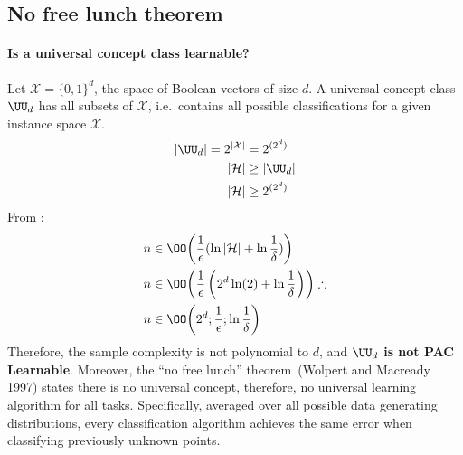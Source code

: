 \documentclass[
  letterpaper,
  12pt,
  british]{tufte-book}
\let\oldparagraph\paragraph
\renewcommand{\paragraph}[1]{\oldparagraph{#1}\mbox{}}
\theoremstyle{plain}
\theoremstyle{definition}
\theoremstyle{plain}
\theoremstyle{remark}
\begin{document}
\hypertarget{no-free-lunch-theorem}{%
\subsection{No free lunch theorem}\label{no-free-lunch-theorem}}

\hypertarget{is-a-universal-concept-class-learnable}{%
\paragraph{Is a universal concept class
learnable?}\label{is-a-universal-concept-class-learnable}}

Let \(\mathcal{X}=\{0,1\}^{d}\), the space of Boolean vectors of size
\(d\). A universal concept class \(\UU_d\) has all subsets of
\(\mathcal{X}\), i.e.~contains all possible classifications for a given
instance space \(\mathcal{X}\). \begin{align}
    |\UU_d| = 2^{|\mathcal{X}|}&=2^{(2^d)} \\
    |\mathcal{H}| &\geq |\UU_d| \\
    |\mathcal{H}| &\geq 2^{(2^d)}
\end{align} From : \begin{align}
    n &\in \OO \biggl( \frac{1}{\epsilon}(\ln{|\mathcal{H}|} + \ln{\frac{1}{\delta}})\biggr)\\
    n &\in \OO \biggl( \frac{1}{\epsilon}\left(2^d \ln(2) + \ln{\frac{1}{\delta}}\right)\biggr) \therefore\\
    n &\in \OO \biggl( 2^d; \frac{1}{\epsilon}; \ln{\frac{1}{\delta}} \biggr)
\end{align} Therefore, the sample complexity is not polynomial to \(d\),
and \textbf{\(\UU_d\) is not PAC Learnable}. Moreover, the ``no free
lunch'' theorem~(Wolpert and Macready
1997)
states there is no universal concept, therefore, no universal learning
algorithm for all tasks. Specifically, averaged over all possible data
generating distributions, every classification algorithm achieves the
same error when classifying previously unknown points.
\end{document}
